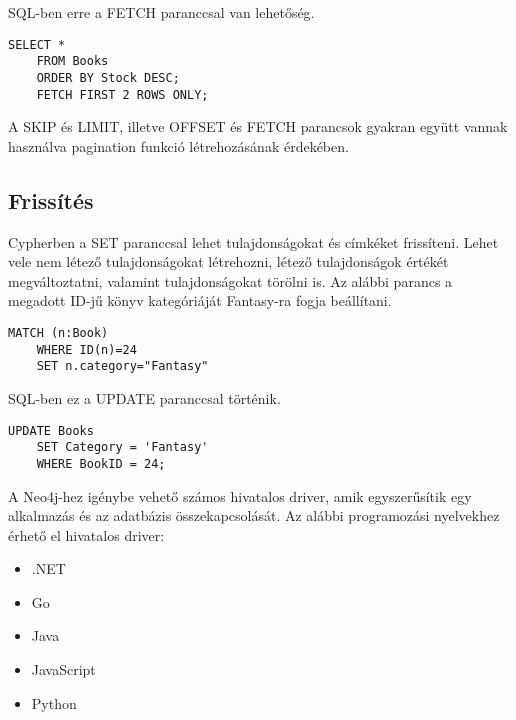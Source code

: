 \bigskip

\noindent SQL-ben erre a FETCH paranccsal van lehetőség.

\begin{lstlisting}[columns=fullflexible]
    SELECT * 
    FROM Books 
    ORDER BY Stock DESC;
    FETCH FIRST 2 ROWS ONLY;
\end{lstlisting}


\bigskip

A SKIP és LIMIT, illetve OFFSET és FETCH parancsok gyakran együtt vannak használva pagination funkció létrehozásának érdekében.

\subsection{Frissítés}
Cypherben a SET paranccsal lehet tulajdonságokat és címkéket frissíteni. Lehet vele nem létező tulajdonságokat létrehozni, létező tulajdonságok értékét megváltoztatni, valamint tulajdonságokat törölni is. Az alábbi parancs a megadott ID-jű könyv kategóriáját Fantasy-ra fogja beállítani.

\begin{lstlisting}[columns=fullflexible]
    MATCH (n:Book) 
    WHERE ID(n)=24
    SET n.category="Fantasy"
\end{lstlisting}

\bigskip

\noindent SQL-ben ez a UPDATE paranccsal történik.

\begin{lstlisting}[columns=fullflexible]
    UPDATE Books
    SET Category = 'Fantasy'
    WHERE BookID = 24;
\end{lstlisting}




A Neo4j-hez igénybe vehető számos hivatalos driver, amik egyszerűsítik egy alkalmazás és az adatbázis összekapcsolását. Az alábbi programozási nyelvekhez érhető el hivatalos driver:

\begin{itemize}
    \item .NET
    \item Go
    \item Java
    \item JavaScript
    \item Python
\end{itemize}

